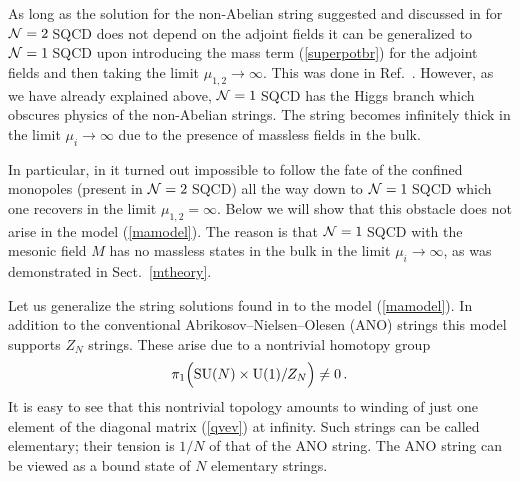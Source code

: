 \documentclass[epsfig,12pt]{article}
\def\beq{\begin{equation}}
\def\eeq{\end{equation}}
\newcommand{\ntwo}{${\cal N}=2\;$}
\newcommand{\none}{${\cal N}=1\;$}
\begin{document}
As long as the solution for the non-Abelian string
suggested and discussed in \cite{ABEKY,SYmon} for \ntwo SQCD does not
depend on the adjoint fields it can be  generalized to \none SQCD
upon introducing the mass term (\ref{superpotbr}) for the adjoint fields and then
taking the limit $\mu_{1,2}\to \infty$. This was done in Ref.~\cite{SYnone}.
However, as we have  already explained above,  \none SQCD has the Higgs branch which obscures
physics of the non-Abelian strings. The string becomes infinitely thick in the 
limit $\mu_i\to \infty$ due to the presence of massless fields in the bulk.

In particular, in \cite{SYnone} it turned out impossible  to follow the fate of 
the confined monopoles (present in \ntwo SQCD) all the way down to \none SQCD
which one recovers in the limit  $\mu_{1,2} = \infty$. Below we will show that this
obstacle does not arise in the model (\ref{mamodel}). The reason is that
\none SQCD with the mesonic field $M$ has
no massless states  in the bulk in the limit $\mu_i\to \infty$, as 
was demonstrated in  Sect.~\ref{mtheory}.

\vspace{2mm}

Let us  generalize the string solutions found in \cite{ABEKY,SYmon}
to the model (\ref{mamodel}).
In addition to the conventional Abrikosov--Nielsen--Olesen (ANO) strings \cite{ANO}
this model supports $Z_N$ strings. These arise due  to a nontrivial homotopy
group 
\beq
\pi_1 \Big({\rm SU}(N)\times {\rm U}(1)/ Z_N
\Big)
\neq 0\,.
\eeq
It is easy to see that this nontrivial topology amounts to winding
of just one element of the diagonal matrix (\ref{qvev}) at infinity.
Such strings can be called elementary;
their tension is $1/N$ of that of the ANO string.
The ANO string can be viewed as a bound state of $N$ elementary strings.
\end{document}
